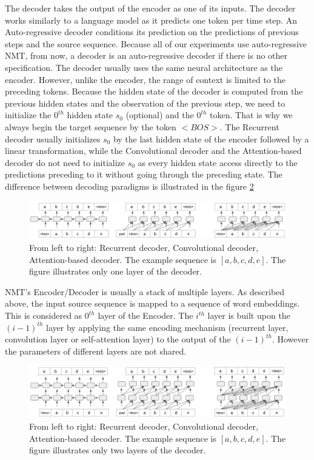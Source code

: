 The decoder takes the output of the encoder as one of its inputs. The decoder works similarly to a language model as it predicts one token per time step. An Auto-regressive decoder conditions its prediction on the predictions of previous steps and the source sequence. Because all of our experiments use auto-regressive NMT, from now, a decoder is an auto-regressive decoder if there is no other specification. The decoder usually uses the same neural architecture as the encoder. However, unlike the encoder, the range of context is limited to the preceding tokens. Because the hidden state of the decoder is computed from the previous hidden states and the observation of the previous step, we need to initialize the $0^{th}$ hidden state $s_0$ (optional) and the $0^{th}$ token. That is why we always begin the target sequence by the token $<BOS>$. The Recurrent decoder usually initializes $s_0$ by the last hidden state of the encoder followed by a linear transformation, while the Convolutional decoder and the Attention-based decoder do not need to initialize $s_0$ as every hidden state access directly to the predictions preceding to it without going through the preceding state. The difference between decoding paradigms is illustrated in the figure \ref{fig:decoding}

\begin{figure}[htbp]
\includegraphics[width=\textwidth]{graphics/decoding.png}
\caption[Illustration of 3 most popular auto-regressive decoding paradigms]{From left to right: Recurrent decoder, Convolutional decoder, Attention-based decoder. The example sequence is $[a,b,c,d,e]$. The figure illustrates only one layer of the decoder.}
\label{fig:decoding}
\end{figure}

NMT's Encoder/Decoder is usually a stack of multiple layers. As described above, the input source sequence is mapped to a sequence of word embeddings. This is considered as $0^{th}$ layer of the Encoder. The $i^{th}$ layer is built upon the $(i-1)^{th}$ layer by applying the same encoding mechanism (recurrent layer, convolution layer or self-attention layer) to the output of the $(i-1)^{th}$. However the parameters of different layers are not shared.

\begin{figure}[htbp]
\includegraphics[width=\textwidth]{graphics/multi_layer_decoder.png}
\caption[Illustration of 3 most popular multi-layer auto-regressive decoding paradigms]{From left to right: Recurrent decoder, Convolutional decoder, Attention-based decoder. The example sequence is $[a,b,c,d,e]$. The figure illustrates only two layers of the decoder.}
\label{fig:decoding}
\end{figure}

